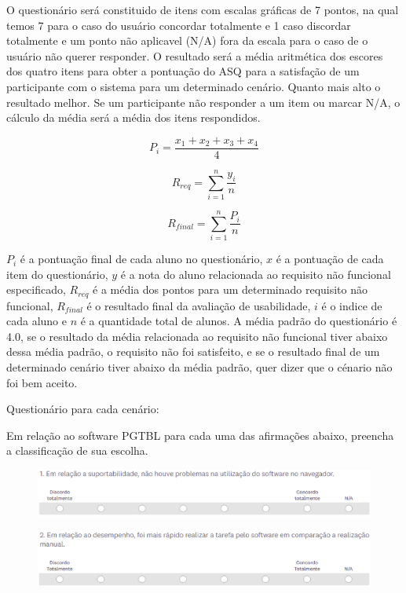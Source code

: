 O questionário será constituido de itens com escalas gráficas de 7 pontos, na qual temos 7 para o caso do usuário concordar
totalmente e 1 caso discordar totalmente e um ponto não aplicavel (N/A) fora da escala para o caso de o usuário não
querer responder. O resultado será a média aritmética dos escores dos quatro itens para obter a pontuação do ASQ para a
satisfação de um participante com o sistema para um determinado cenário. Quanto mais alto o resultado melhor. Se um
participante não responder a um item ou marcar N/A, o cálculo da média será a média dos itens respondidos.

$$P_{i} = \frac{x_{1} + x_{2} + x_{3} + x_{4}}{4}$$

$$R_{req} = \sum_{i=1}^{n} \frac{y_{i}}{n}$$

$$R_{final} = \sum_{i=1}^{n} \frac{P_{i}}{n}$$

$P_i$ é a pontuação final de cada aluno no questionário, $x$ é a pontuação de cada item do questionário, $y$ é a nota do
aluno relacionada ao requisito não funcional especificado, $R_{req}$ é a média dos pontos para um determinado requisito
não funcional, $R_{final}$ é o resultado final da avaliação de usabilidade, $i$ é o indice de cada aluno e $n$ é a
quantidade total de alunos. A média padrão do questionário é 4.0, se o resultado da média relacionada ao requisito não
funcional tiver abaixo dessa média padrão, o requisito não foi satisfeito, e se o resultado final de um determinado cenário
tiver abaixo da média padrão, quer dizer que o cénario não foi bem aceito.

Questionário para cada cenário:

Em relação ao software PGTBL para cada uma das afirmações abaixo, preencha a classificação de sua escolha.

\begin{figure}[h!]
  \centering
  \includegraphics[keepaspectratio=true,scale=0.5]{figuras/p1.eps}
\end{figure}

\begin{figure}[h!]
  \centering
  \includegraphics[keepaspectratio=true,scale=0.5]{figuras/p2.eps}
\end{figure}

